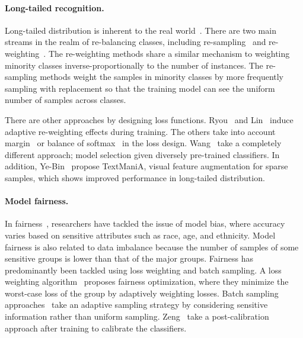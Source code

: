 \paragraph{Long-tailed recognition.}
Long-tailed distribution is inherent to the real world~\cite{cui2019class,zhang2023deep}.
There are two main streams in the realm of re-balancing classes, including re-sampling~\cite{shen2016relay,park2022majority,kim2020m2m,liu2019large} and re-weighting~\cite{he2009learning,samuel2021distributional, cao2019learning, ren2020balanced, lin2017focal, ryou2019anchor, cui2019class}.
The re-weighting methods share a similar mechanism to weighting minority classes inverse-proportionally to the number of instances. 
The re-sampling methods weight the samples in minority classes by more frequently sampling with replacement so that the training model can see the uniform number of samples across classes.

There are other approaches 
by designing loss functions.
Ryou~\etal\cite{ryou2019anchor} and Lin~\etal\cite{lin2017focal} 
induce adaptive re-weighting effects during training.
The others take into account margin~\cite{cao2019learning} or balance of softmax~\cite{ren2020balanced} in the loss design.
Wang~\etal\cite{wang2021longtailed} take a completely different approach; model selection given diversely pre-trained classifiers.
In addition, Ye-Bin~\etal\cite{yebin2023textmania} propose
TextManiA, visual feature augmentation for sparse samples, which shows improved performance in long-tailed distribution.


\paragraph{Model fairness.} 
In fairness~\cite{narayanan2018translation, hardt2016equality, 10.1145/2783258.2783311}, researchers have tackled the issue of model bias, where accuracy varies based on 
sensitive attributes such as race, age, and ethnicity.
Model fairness is also related to data imbalance because the number of samples of some sensitive groups is lower than that of the major groups.
Fairness has predominantly been tackled using loss weighting and batch sampling.
A loss weighting algorithm~\cite{jung2023reweighting} proposes fairness optimization, where they minimize the worst-case loss of the group by adaptively weighting losses.
Batch sampling approaches~\cite{kamiran2012data, roh2020fairbatch} take an adaptive sampling strategy by considering sensitive information rather than uniform sampling.
Zeng~\etal\cite{zeng2022fair} take a post-calibration approach after training
to calibrate the classifiers.


